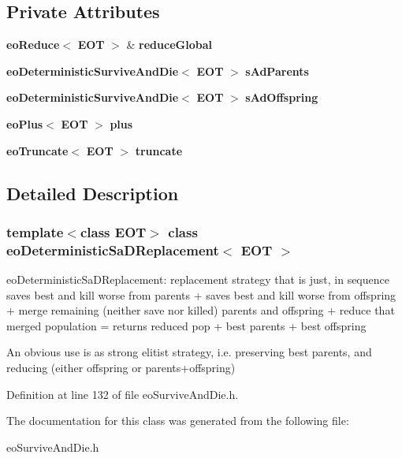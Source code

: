 \subsection*{Private Attributes}
\begin{CompactItemize}
\item 
{\bf eo\-Reduce}$<$ {\bf EOT} $>$ \& {\bf reduce\-Global}\label{classeo_deterministic_sa_d_replacement_r0}

\item 
{\bf eo\-Deterministic\-Survive\-And\-Die}$<$ {\bf EOT} $>$ {\bf s\-Ad\-Parents}\label{classeo_deterministic_sa_d_replacement_r1}

\item 
{\bf eo\-Deterministic\-Survive\-And\-Die}$<$ {\bf EOT} $>$ {\bf s\-Ad\-Offspring}\label{classeo_deterministic_sa_d_replacement_r2}

\item 
{\bf eo\-Plus}$<$ {\bf EOT} $>$ {\bf plus}\label{classeo_deterministic_sa_d_replacement_r3}

\item 
{\bf eo\-Truncate}$<$ {\bf EOT} $>$ {\bf truncate}\label{classeo_deterministic_sa_d_replacement_r4}

\end{CompactItemize}


\subsection{Detailed Description}
\subsubsection*{template$<$class EOT$>$ class eo\-Deterministic\-Sa\-DReplacement$<$ EOT $>$}

eo\-Deterministic\-Sa\-DReplacement: replacement strategy that is just, in sequence saves best and kill worse from parents + saves best and kill worse from offspring + merge remaining (neither save nor killed) parents and offspring + reduce that merged population = returns reduced pop + best parents + best offspring 

An obvious use is as strong elitist strategy, i.e. preserving best parents, and reducing (either offspring or parents+offspring) 



Definition at line 132 of file eo\-Survive\-And\-Die.h.

The documentation for this class was generated from the following file:\begin{CompactItemize}
\item 
eo\-Survive\-And\-Die.h\end{CompactItemize}
